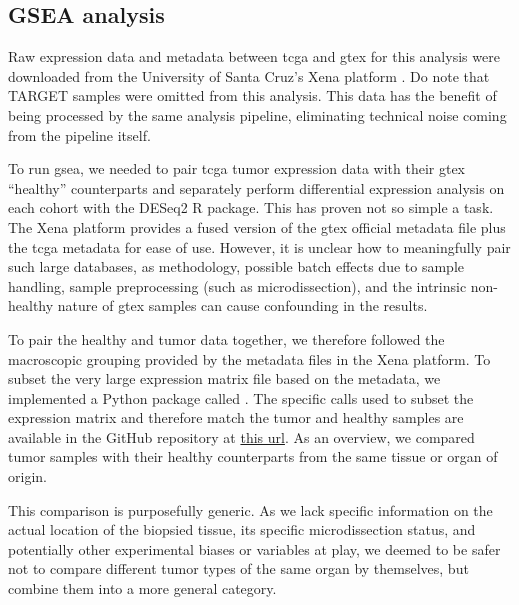 \subsection{GSEA analysis}

Raw expression data and metadata between \gls{tcga} and \gls{gtex} for this analysis were downloaded from the University of Santa Cruz's Xena platform \cite{UCSCXena}.
Do note that TARGET samples were omitted from this analysis.
This data has the benefit of being processed by the same analysis pipeline, eliminating technical noise coming from the pipeline itself.

To run \gls{gsea}, we needed to pair \gls{tcga} tumor expression data with their \gls{gtex} ``healthy'' counterparts and separately perform differential expression analysis on each cohort with the DESeq2 R package.
This has proven not so simple a task.
The Xena platform provides a fused version of the \gls{gtex} official metadata file plus the \gls{tcga} metadata for ease of use.
However, it is unclear how to meaningfully pair such large databases, as methodology, possible batch effects due to sample handling, sample preprocessing (such as microdissection), and the intrinsic non-healthy nature of \gls{gtex} samples can cause confounding in the results.

To pair the healthy and tumor data together, we therefore followed the macroscopic grouping provided by the metadata files in the Xena platform.
To subset the very large expression matrix file based on the metadata, we implemented a Python package called .
The specific calls used to subset the expression matrix and therefore match the tumor and healthy samples are available in the GitHub repository at \href{https://github.com/CMA-Lab/transportome_profiler/blob/main/src/run_dea/tcga_gtex_queries.json}{this url}.
As an overview, we compared tumor samples with their healthy counterparts from the same tissue or organ of origin.

This comparison is purposefully generic.
As we lack specific information on the actual location of the biopsied tissue, its specific microdissection status, and potentially other experimental biases or variables at play, we deemed to be safer not to compare different tumor types of the same organ by themselves, but combine them into a more general category.

